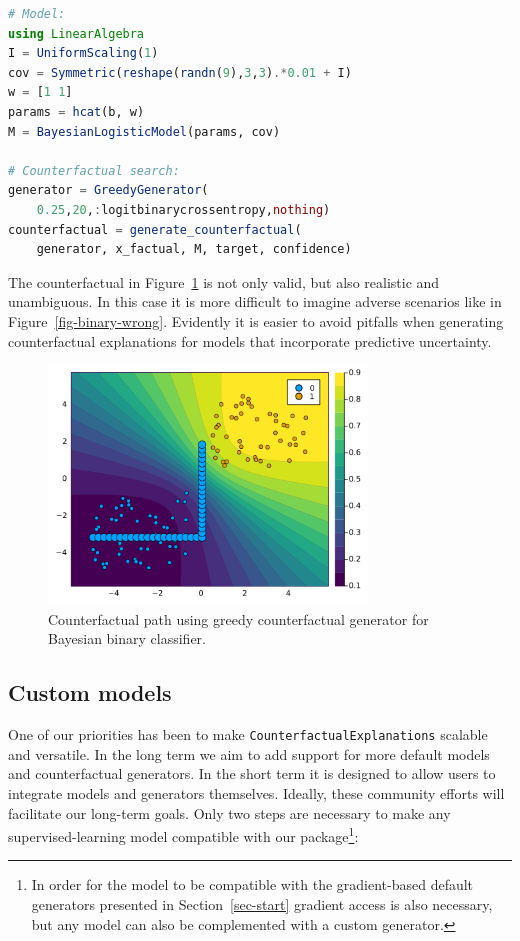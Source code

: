\documentclass[
  letterpaper,
  DIV=11,
  numbers=noendperiod]{scrartcl}
\begin{document}
\begin{lstlisting}[language = Julia]
# Model:
using LinearAlgebra
I = UniformScaling(1)
cov = Symmetric(reshape(randn(9),3,3).*0.01 + I) 
w = [1 1]
params = hcat(b, w)
M = BayesianLogisticModel(params, cov)

# Counterfactual search:
generator = GreedyGenerator(
    0.25,20,:logitbinarycrossentropy,nothing)
counterfactual = generate_counterfactual(
    generator, x_factual, M, target, confidence)
\end{lstlisting}

The counterfactual in Figure~\ref{fig-binary-laplace} is not only valid,
but also realistic and unambiguous. In this case it is more difficult to
imagine adverse scenarios like in Figure~\ref{fig-binary-wrong}.
Evidently it is easier to avoid pitfalls when generating counterfactual
explanations for models that incorporate predictive uncertainty.

\begin{figure}

{\centering \includegraphics[width=3.33333in,height=2.5in]{www/ce_binary_laplace.png}

}

\caption{\label{fig-binary-laplace}Counterfactual path using greedy
counterfactual generator for Bayesian binary classifier.}

\end{figure}

\hypertarget{custom-models}{%
\subsection{Custom models}\label{custom-models}}

One of our priorities has been to make
\texttt{CounterfactualExplanations} scalable and versatile. In the long
term we aim to add support for more default models and counterfactual
generators. In the short term it is designed to allow users to integrate
models and generators themselves. Ideally, these community efforts will
facilitate our long-term goals. Only two steps are necessary to make any
supervised-learning model compatible with our package\footnote{In order
  for the model to be compatible with the gradient-based default
  generators presented in Section~\ref{sec-start} gradient access is
  also necessary, but any model can also be complemented with a custom
  generator.}:
\end{document}
